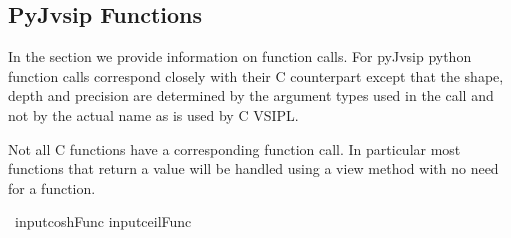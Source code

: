 \subsection*{PyJvsip Functions}
In the \pyjv {} section we provide information on function calls. For pyJvsip python function calls correspond closely with their C counterpart except that the shape, depth and precision are determined by the argument types used in the call and not by the actual name as is used by C VSIPL.

Not all C functions have a corresponding \pyjv function call. In particular most functions that return a value will be handled using a view method with no need for a function.
 













\
input{coshFunc}
input{ceilFunc}

































































